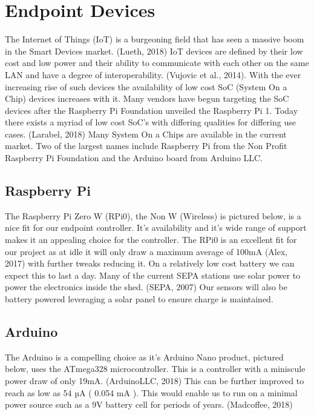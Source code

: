 

\section{Endpoint Devices}

The Internet of Things (IoT) is a burgeoning field that has seen a massive boom in the Smart Devices market. (Lueth, 2018)⁠ IoT devices are defined by their low cost and low power and their ability to communicate with each other on the same LAN and have a degree of interoperability. (Vujovic et al., 2014)⁠. With the ever increasing rise of such devices the availability of low cost SoC (System On a Chip) devices increases with it. Many vendors have begun targeting the SoC devices after the Raspberry Pi Foundation unveiled the Raspberry Pi 1. Today there exists a myriad of low cost SoC’s with differing qualities for differing use cases. (Larabel, 2018) Many System On a Chips are available in the current market. Two of the largest names include Raspberry Pi from the Non Profit Raspberry Pi Foundation and the Arduino board from Arduino LLC. 

\subsection{Raspberry Pi}
The Raspberry Pi Zero W (RPi0), the Non W (Wireless) is pictured below, is a nice fit for our endpoint controller.  It’s availability and it’s wide range of support makes it an appealing choice for the controller. The RPi0 is an excellent fit for our project as at idle it will only draw a maximum average of 100mA (Alex, 2017)⁠ with further tweaks reducing it. On a relatively low cost battery we can expect this to last a day. Many of the current SEPA stations use solar power to power the electronics inside the shed. (SEPA, 2007) Our sensors will also be battery powered leveraging a solar panel to ensure charge is maintained.


\subsection{Arduino}
The Arduino is a compelling choice as it’s Arduino Nano product, pictured below, uses the ATmega328 microcontroller. This is a controller with a miniscule power draw of only 19mA. (ArduinoLLC, 2018)⁠ This can be further improved to reach as low as 54 µA ( 0.054 mA ). This would enable us to run on a minimal power source such as a 9V battery cell for periods of years. (Madcoffee, 2018)⁠ 


